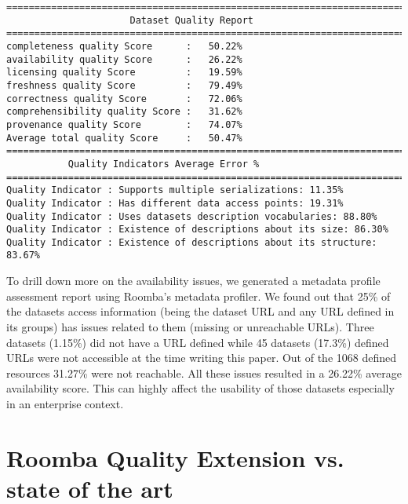 \begin{lstlisting}
========================================================================
                      Dataset Quality Report
========================================================================
completeness quality Score      :   50.22%
availability quality Score      :   26.22%
licensing quality Score         :   19.59%
freshness quality Score         :   79.49%
correctness quality Score       :   72.06%
comprehensibility quality Score :   31.62%
provenance quality Score        :   74.07%
Average total quality Score     :   50.47%
========================================================================
           Quality Indicators Average Error %
========================================================================
Quality Indicator : Supports multiple serializations: 11.35%
Quality Indicator : Has different data access points: 19.31%
Quality Indicator : Uses datasets description vocabularies: 88.80%
Quality Indicator : Existence of descriptions about its size: 86.30%
Quality Indicator : Existence of descriptions about its structure: 83.67%
\end{lstlisting}

To drill down more on the availability issues, we generated a metadata profile assessment report using Roomba's metadata profiler. We found out that 25\% of the datasets access information (being the dataset URL and any URL defined in its groups) has issues related to them (missing or unreachable URLs).
Three datasets (1.15\%) did not have a URL defined while 45 datasets (17.3\%) defined URLs were not accessible at the time writing this paper. Out of the 1068 defined resources 31.27\% were not reachable. All these issues resulted in a 26.22\% average availability score. This can highly affect the usability of those datasets especially in an enterprise context.

\section{Roomba Quality Extension vs. state of the art}

